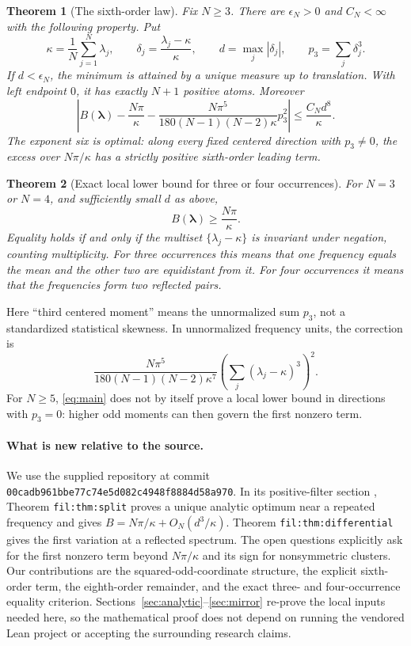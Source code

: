\documentclass[11pt,a4paper]{article}
\newtheorem{theorem}{Theorem}[section]
\theoremstyle{remark}\newtheorem{remark}[theorem]{Remark}
\begin{document}
\begin{theorem}[The sixth-order law]\label{thm:main}
Fix $N\ge3$. There are $\epsilon_N>0$ and $C_N<\infty$ with the following property. Put
\[
 \kappa=\frac1N\sum_{j=1}^N\lambda_j,\qquad
 \delta_j=\frac{\lambda_j-\kappa}{\kappa},\qquad
 d=\max_j|\delta_j|,\qquad p_3=\sum_j\delta_j^3.
\]
If $d<\epsilon_N$, the minimum is attained by a unique measure up to translation. With left endpoint $0$, it has exactly $N+1$ positive atoms. Moreover
\begin{equation}\label{eq:main}
 \left|B(\boldsymbol\lambda)-\frac{N\pi}{\kappa}
 -\frac{N\pi^5}{180(N-1)(N-2)\kappa}p_3^2\right|
 \le\frac{C_Nd^8}{\kappa}.
\end{equation}
The exponent six is optimal: along every fixed centered direction with $p_3\ne0$, the excess over $N\pi/\kappa$ has a strictly positive sixth-order leading term.
\end{theorem}

\begin{theorem}[Exact local lower bound for three or four occurrences]\label{thm:equality}
For $N=3$ or $N=4$, and sufficiently small $d$ as above,
\[
 B(\boldsymbol\lambda)\ge\frac{N\pi}{\kappa}.
\]
Equality holds if and only if the multiset $\{\lambda_j-\kappa\}$ is invariant under negation, counting multiplicity. For three occurrences this means that one frequency equals the mean and the other two are equidistant from it. For four occurrences it means that the frequencies form two reflected pairs.
\end{theorem}

Here ``third centered moment'' means the unnormalized sum $p_3$, not a standardized statistical skewness. In unnormalized frequency units, the correction is
\[
 \frac{N\pi^5}{180(N-1)(N-2)\kappa^7}
      \left(\sum_j(\lambda_j-\kappa)^3\right)^2.
\]
For $N\ge5$, \eqref{eq:main} does not by itself prove a local lower bound in directions with $p_3=0$: higher odd moments can then govern the first nonzero term.

\paragraph{What is new relative to the source.}
We use the supplied repository at commit
\texttt{00cadb961bbe77c74e5d082c4948f8884d58a970}. In its positive-filter section \cite{ProveIt}, Theorem \texttt{fil:thm:split} proves a unique analytic optimum near a repeated frequency and gives
$B=N\pi/\kappa+O_N(d^3/\kappa)$. Theorem \texttt{fil:thm:differential} gives the first variation at a reflected spectrum. The open questions explicitly ask for the first nonzero term beyond $N\pi/\kappa$ and its sign for nonsymmetric clusters. Our contributions are the squared-odd-coordinate structure, the explicit sixth-order term, the eighth-order remainder, and the exact three- and four-occurrence equality criterion. Sections~\ref{sec:analytic}--\ref{sec:mirror} re-prove the local inputs needed here, so the mathematical proof does not depend on running the vendored Lean project or accepting the surrounding research claims.
\end{document}
